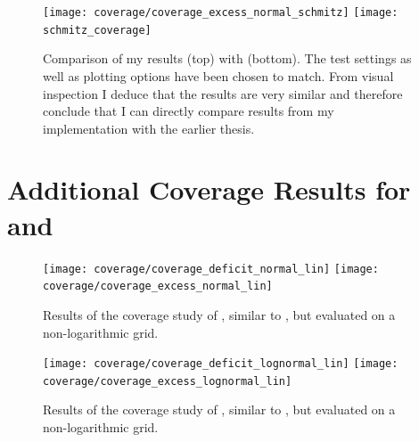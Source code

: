 \begin{figure}
    \centering
    \texttt{[image: coverage/coverage\_excess\_normal\_schmitz]}
    \texttt{[image: schmitz\_coverage]}
    \caption{Comparison of my results (top) with \cite{Schmitz:ModelUnspecificSearch} (bottom). The test settings as well as plotting options have been chosen to match. From visual inspection I deduce that the results are very similar and therefore conclude that I can directly compare results from my implementation with the earlier thesis.}
    \label{fig:coverage_schmitz}
\end{figure}

\newpage
\section{Additional Coverage Results for \TS and \TSprime}
\label{app:coverage_additional_results}

\begin{figure}
    \centering
    \texttt{[image: coverage/coverage\_deficit\_normal\_lin]}
    \texttt{[image: coverage/coverage\_excess\_normal\_lin]}
    \caption{Results of the coverage study of \TS, similar to , but evaluated on a non-logarithmic grid.}
\end{figure}

\begin{figure}
    \centering
    \texttt{[image: coverage/coverage\_deficit\_lognormal\_lin]}
    \texttt{[image: coverage/coverage\_excess\_lognormal\_lin]}
    \caption{Results of the coverage study of \TSprime, similar to , but evaluated on a non-logarithmic grid.}
\end{figure}